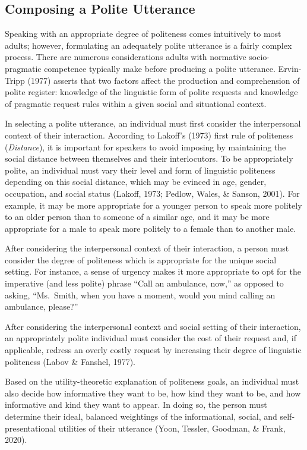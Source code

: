 \documentclass[
  english,
  man,floatsintext]{apa6}
\begin{document}
\hypertarget{composing-a-polite-utterance}{%
\subsection{Composing a Polite Utterance}\label{composing-a-polite-utterance}}

Speaking with an appropriate degree of politeness comes intuitively to most adults; however, formulating an adequately polite utterance is a fairly complex process. There are numerous considerations adults with normative socio-pragmatic competence typically make before producing a polite utterance. Ervin-Tripp (1977) asserts that two factors affect the production and comprehension of polite register: knowledge of the linguistic form of polite requests and knowledge of pragmatic request rules within a given social and situational context.

In selecting a polite utterance, an individual must first consider the interpersonal context of their interaction. According to Lakoff's (1973) first rule of politeness (\emph{Distance}), it is important for speakers to avoid imposing by maintaining the social distance between themselves and their interlocutors. To be appropriately polite, an individual must vary their level and form of linguistic politeness depending on this social distance, which may be evinced in age, gender, occupation, and social status (Lakoff, 1973; Pedlow, Wales, \& Sanson, 2001). For example, it may be more appropriate for a younger person to speak more politely to an older person than to someone of a similar age, and it may be more appropriate for a male to speak more politely to a female than to another male.

After considering the interpersonal context of their interaction, a person must consider the degree of politeness which is appropriate for the unique social setting. For instance, a sense of urgency makes it more appropriate to opt for the imperative (and less polite) phrase ``Call an ambulance, now,'' as opposed to asking, ``Ms.~Smith, when you have a moment, would you mind calling an ambulance, please?''

After considering the interpersonal context and social setting of their interaction, an appropriately polite individual must consider the cost of their request and, if applicable, redress an overly costly request by increasing their degree of linguistic politeness (Labov \& Fanshel, 1977).

Based on the utility-theoretic explanation of politeness goals, an individual must also decide how informative they want to be, how kind they want to be, and how informative and kind they want to appear. In doing so, the person must determine their ideal, balanced weightings of the informational, social, and self- presentational utilities of their utterance (Yoon, Tessler, Goodman, \& Frank, 2020).
\end{document}
